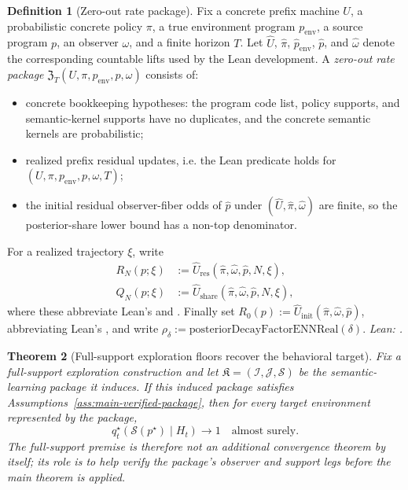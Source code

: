 \documentclass[11pt]{article}
\newtheorem{theorem}{Theorem}[section]
\theoremstyle{definition}
\newtheorem{definition}[theorem]{Definition}
\theoremstyle{remark}
\theoremstyle{plain}
\theoremstyle{definition}
\newcommand{\Scal}{\mathcal{S}}
\begin{document}
\begin{definition}[Zero-out rate package]
\label{def:zero-out-rate-package}
Fix a concrete prefix machine $U$, a probabilistic concrete policy $\pi$, a true environment program $p_{\mathrm{env}}$, a source program $p$, an observer $\omega$, and a finite horizon $T$. Let $\widehat U$, $\widehat\pi$, $\widehat p_{\mathrm{env}}$, $\widehat p$, and $\widehat\omega$ denote the corresponding countable lifts used by the Lean development. A \emph{zero-out rate package} $\mathfrak Z_T(U,\pi,p_{\mathrm{env}},p,\omega)$ consists of:
\begin{itemize}
\item[(Z1)] concrete bookkeeping hypotheses: the program code list, policy supports, and semantic-kernel supports have no duplicates, and the concrete semantic kernels are probabilistic;
\item[(Z2)] realized prefix residual updates, i.e. the Lean predicate  holds for $(U,\pi,p_{\mathrm{env}},p,\omega,T)$;
\item[(Z3)] the initial residual observer-fiber odds of $\widehat p$ under $(\widehat U,\widehat\pi,\widehat\omega)$ are finite, so the posterior-share lower bound has a non-top denominator.
\end{itemize}
For a realized trajectory $\xi$, write
\[
\begin{aligned}
R_N(p;\xi)&:=\widehat U_{\mathrm{res}}(\widehat\pi,\widehat\omega,\widehat p,N,\xi),\\
Q_N(p;\xi)&:=\widehat U_{\mathrm{share}}(\widehat\pi,\widehat\omega,\widehat p,N,\xi),
\end{aligned}
\]
where these abbreviate Lean's  and . Finally set $R_0(p):=\widehat U_{\mathrm{init}}(\widehat\pi,\widehat\omega,\widehat p)$, abbreviating Lean's , and write $\rho_\delta:=\mathrm{posteriorDecayFactorENNReal}(\delta)$.
\noindent\emph{Lean: .}
\end{definition}

\begin{theorem}[Full-support exploration floors recover the behavioral target]
\label{thm:exploration-floor-behavioral}
Fix a full-support exploration construction and let $\mathfrak K=(\mathcal I,\mathcal J,\Scal)$ be the semantic-learning package it induces. If this induced package satisfies Assumptions~\ref{ass:main-verified-package}, then for every target environment represented by the package,
\[
q_t^\star(\Scal(p^\star)\mid H_t)\longrightarrow 1
\quad\text{almost surely.}
\]
The full-support premise is therefore not an additional convergence theorem by itself; its role is to help verify the package's observer and support legs before the main theorem is applied.
\end{theorem}
\end{document}
